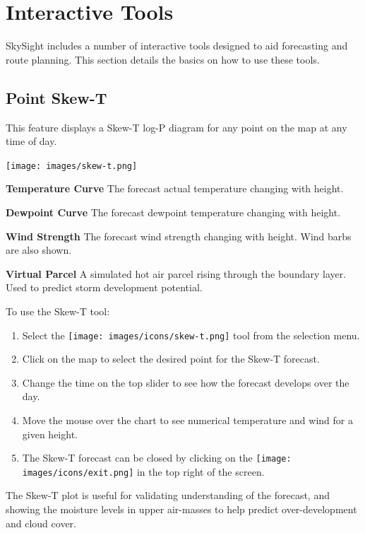 \documentclass[11pt,a4paper]{article}
\begin{document}
\section{Interactive Tools}
SkySight includes a number of interactive tools designed to aid forecasting and route planning. This section details the basics on how to use these tools.
\subsection{Point Skew-T}
This feature displays a Skew-T log-P diagram for any point on the map at any time of day.
\begin{center}
\texttt{[image: images/skew-t.png]}
\end{center}
\begin{arrow_red}
\item \textbf{Temperature Curve} The forecast actual temperature changing with height.
\end{arrow_red}
\begin{arrow_green}
\item \textbf{Dewpoint Curve} The forecast dewpoint temperature changing with height.
\end{arrow_green}
\begin{arrow_blue}
\item \textbf{Wind Strength} The forecast wind strength changing with height. Wind barbs are also shown.
\end{arrow_blue}
\begin{arrow_pink}
\item \textbf{Virtual Parcel} A simulated hot air parcel rising through the boundary layer. Used to predict storm development potential.
\end{arrow_pink}
To use the Skew-T tool:
\begin{enumerate}
\item Select the \texttt{[image: images/icons/skew-t.png]} tool from the selection menu.
\item Click on the map to select the desired point for the Skew-T forecast. 
\item Change the time on the top slider to see how the forecast develops over the day.
\item Move the mouse over the chart to see numerical temperature and wind for a given height.
\item The Skew-T forecast can be closed by clicking on the \texttt{[image: images/icons/exit.png]} in the top right of the screen.
\end{enumerate}
\begin{tip}
\item The Skew-T plot is useful for validating understanding of the forecast, and showing the moisture levels in upper air-masses to help predict over-development and cloud cover.
\end{tip}
\end{document}
